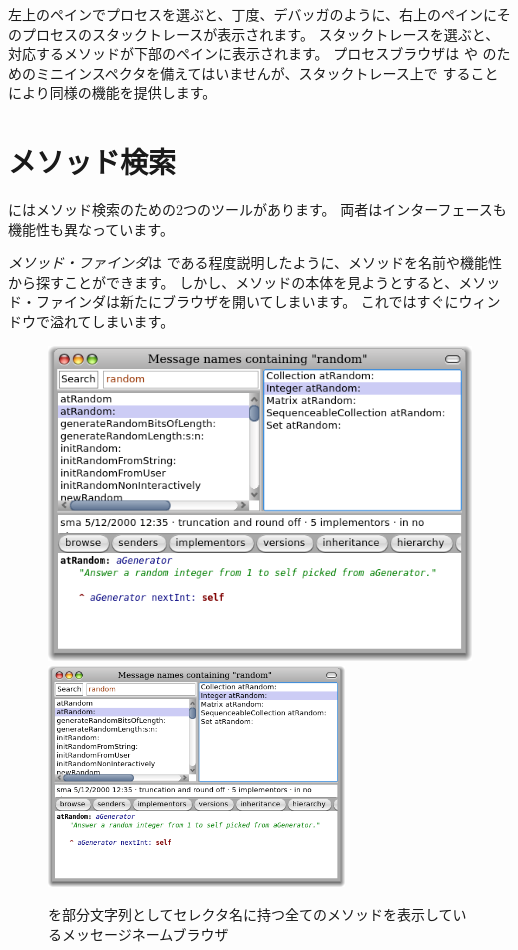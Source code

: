 \documentclass[a4paper,10pt,twoside]{book}
\begin{document}
左上のペインでプロセスを選ぶと、丁度、デバッガのように、右上のペインにそのプロセスのスタックトレースが表示されます。
スタックトレースを選ぶと、対応するメソッドが下部のペインに表示されます。
プロセスブラウザは \self や  のためのミニインスペクタを備えてはいませんが、スタックトレース上で  することにより同様の機能を提供します。

\section{メソッド検索}

\pharo にはメソッド検索のための2つのツールがあります。
両者はインターフェースも機能性も異なっています。

\emph{メソッド・ファインダ}は  である程度説明したように、メソッドを名前や機能性から探すことができます。
しかし、メソッドの本体を見ようとすると、メソッド・ファインダは新たにブラウザを開いてしまいます。
これではすぐにウィンドウで溢れてしまいます。

\begin{figure}[btp]
\begin{center}
\ifluluelse
{\includegraphics[width=\textwidth]{methodNamesRandom}}
{\includegraphics[width=0.7\textwidth]{methodNamesRandom}}
\end{center}
\caption{ を部分文字列としてセレクタ名に持つ全てのメソッドを表示しているメッセージネームブラウザ}
\end{figure}
\end{document}
